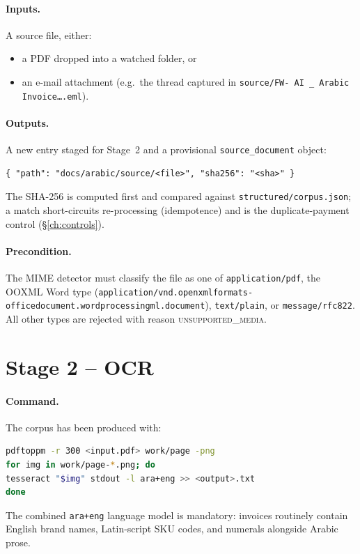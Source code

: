 \documentclass[11pt,a4paper,twoside]{report}
\newcommand{\corpus}{}
\begin{document}
\paragraph{Inputs.} A source file, either:
\begin{itemize}
\item a PDF dropped into a watched folder, or
\item an e-mail attachment (e.g.\ the thread captured in
\corpus\texttt{source/FW- AI~\_ Arabic Invoice\ldots.eml}).
\end{itemize}

\paragraph{Outputs.} A new entry staged for Stage~2 and a provisional
\texttt{source\_document} object:
\begin{lstlisting}[language=jsonx]
{ "path": "docs/arabic/source/<file>", "sha256": "<sha>" }
\end{lstlisting}
The SHA-256 is computed first and compared against
\corpus\texttt{structured/corpus.json}; a match short-circuits
re-processing (idempotence) and is the duplicate-payment control
(\S\ref{ch:controls}).

\paragraph{Precondition.} The MIME detector must classify the file as
one of \texttt{application/pdf}, the OOXML Word type
(\texttt{application/vnd.openxmlformats-\allowbreak officedocument.\allowbreak wordprocessingml.\allowbreak document}),
\texttt{text/plain}, or \texttt{message/rfc822}. All other types are
rejected with reason \textsc{unsupported\_media}.

\section{Stage 2 -- OCR}

\paragraph{Command.} The corpus has been produced with:
\begin{lstlisting}[language=bash,basicstyle=\ttfamily\small]
pdftoppm -r 300 <input.pdf> work/page -png
for img in work/page-*.png; do
tesseract "$img" stdout -l ara+eng >> <output>.txt
done
\end{lstlisting}
The combined \texttt{ara+eng} language model is mandatory: invoices
routinely contain English brand names, Latin-script SKU codes, and
numerals alongside Arabic prose.
\end{document}
